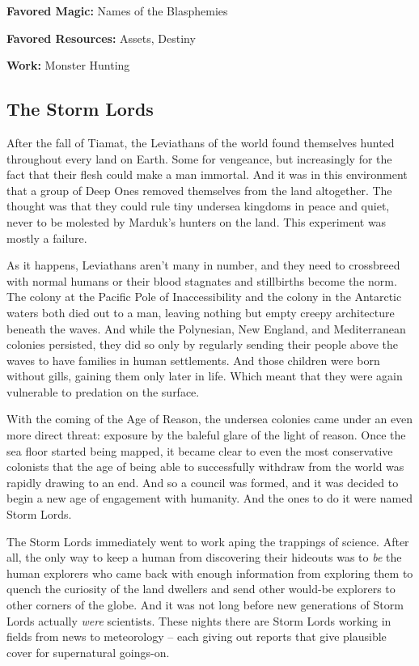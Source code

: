 \textbf{Favored Magic:} Names of the Blasphemies

\textbf{Favored Resources:} Assets, Destiny

\textbf{Work:} Monster Hunting

\subsection{The Storm Lords} 

After the fall of Tiamat, the Leviathans of the world found themselves hunted throughout every land on Earth. Some for vengeance, but increasingly for the fact that their flesh could make a man immortal. And it was in this environment that a group of Deep Ones removed themselves from the land altogether. The thought was that they could rule tiny undersea kingdoms in peace and quiet, never to be molested by Marduk's hunters on the land. This experiment was mostly a failure.

As it happens, Leviathans aren't many in number, and they need to crossbreed with normal humans or their blood stagnates and stillbirths become the norm. The colony at the Pacific Pole of Inaccessibility and the colony in the Antarctic waters both died out to a man, leaving nothing but empty creepy architecture beneath the waves. And while the Polynesian, New England, and Mediterranean colonies persisted, they did so only by regularly sending their people above the waves to have families in human settlements. And those children were born without gills, gaining them only later in life. Which meant that they were again vulnerable to predation on the surface.

With the coming of the Age of Reason, the undersea colonies came under an even more direct threat: exposure by the baleful glare of the light of reason. Once the sea floor started being mapped, it became clear to even the most conservative colonists that the age of being able to successfully withdraw from the world was rapidly drawing to an end. And so a council was formed, and it was decided to begin a new age of engagement with humanity. And the ones to do it were named Storm Lords.

The Storm Lords immediately went to work aping the trappings of science. After all, the only way to keep a human from discovering their hideouts was to \textit{be} the human explorers who came back with enough information from exploring them to quench the curiosity of the land dwellers and send other would-be explorers to other corners of the globe. And it was not long before new generations of Storm Lords actually \textit{were} scientists. These nights there are Storm Lords working in fields from news to meteorology -- each giving out reports that give plausible cover for supernatural goings-on.

